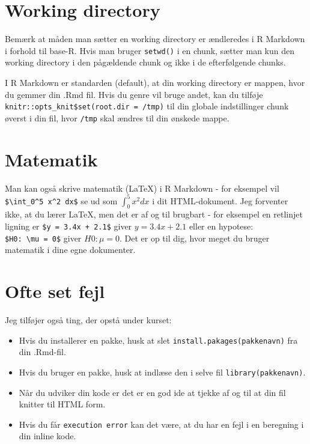 \documentclass[
]{book}
\newenvironment{Shaded}{\begin{snugshade}}{\end{snugshade}}
\newcommand{\InformationTok}[1]{\textcolor[rgb]{0.56,0.35,0.01}{\textbf{\textit{#1}}}}
\providecommand{\tightlist}{%
  \setlength{\itemsep}{0pt}\setlength{\parskip}{0pt}}
\begin{document}
\section{Working directory}\label{working-directory-1}

Bemærk at måden man sætter en working directory er ændleredes i R Markdown i forhold til base-R. Hvis man bruger \texttt{setwd()} i en chunk, sætter man kun den working directory i den pågældende chunk og ikke i de efterfølgende chunks.

I R Markdown er standarden (default), at din working directory er mappen, hvor du gemmer din .Rmd fil. Hvis du genre vil bruge andet, kan du tilføje \texttt{knitr::opts\_knit\$set(root.dir\ =\ \textquotesingle{}/tmp\textquotesingle{})} til din globale indstillinger chunk øverst i din fil, hvor \texttt{\textquotesingle{}/tmp\textquotesingle{}} skal ændres til din ønskede mappe.

\begin{Shaded}
\end{Shaded}

\section{Matematik}\label{matematik}

Man kan også skrive matematik (LaTeX) i R Markdown - for eksempel vil \texttt{\$\textbackslash{}int\_0\^{}5\ x\^{}2\ dx\$} se ud som \(\int_0^5 x^2 dx\) i dit HTML-dokument. Jeg forventer ikke, at du lærer LaTeX, men det er af og til brugbart - for eksempel en retlinjet ligning er \texttt{\$y\ =\ 3.4x\ +\ 2.1\$} giver \(y = 3.4x + 2.1\) eller en hypotese: \texttt{\$H0:\ \textbackslash{}mu\ =\ 0\$} giver \(H0: \mu = 0\). Det er op til dig, hvor meget du bruger matematik i dine egne dokumenter.

\section{Ofte set fejl}\label{ofte-set-fejl}

Jeg tilføjer også ting, der opstå under kurset:

\begin{itemize}
\tightlist
\item
  Hvis du installerer en pakke, husk at slet \texttt{install.pakages(pakkenavn)} fra din .Rmd-fil.
\item
  Hvis du bruger en pakke, husk at indlæse den i selve fil \texttt{library(pakkenavn)}.
\item
  Når du udviker din kode er det er en god ide at tjekke af og til at din fil knitter til HTML form.
\item
  Hvis du får \texttt{execution\ error} kan det være, at du har en fejl i en beregning i din inline kode.
\end{itemize}
\end{document}
